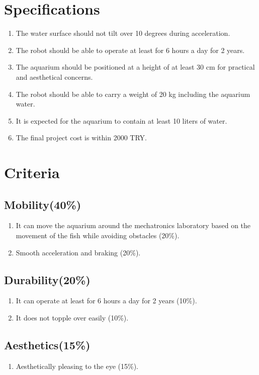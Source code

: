 \documentclass[12pt]{article}
\begin{document}
\section{Specifications}
	\begin{enumerate}
		\item The water surface should not tilt over 10 degrees during acceleration. 
		\item The robot should be able to operate at least for 6 hours a day for 2 years.
		\item The aquarium should be positioned at a height of at least 30 cm for practical and aesthetical concerns.
		\item The robot should be able to carry a weight of 20 kg including the aquarium water.
		\item It is expected for the aquarium to contain at least 10 liters of water.
		\item The final project cost is within 2000 TRY.
	\end{enumerate}

\section{Criteria}

	\subsection{Mobility(40\%)}
		\begin{enumerate}
			\item It can move the aquarium around the mechatronics laboratory based on the movement of the fish while avoiding obstacles (20\%).
			\item Smooth acceleration and braking (20\%).
		\end{enumerate}
	
	\subsection{Durability(20\%)}
		\begin{enumerate}
			\item It can operate at least for 6 hours a day for 2 years (10\%).
			\item It does not topple over easily (10\%).
		\end{enumerate}
	
	\subsection{Aesthetics(15\%)}
		\begin{enumerate}
			\item Aesthetically pleasing to the eye (15\%).
		\end{enumerate}
	
\end{document}
